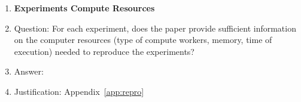 \begin{enumerate}
\item {\bf Experiments Compute Resources}
    \item[] Question: For each experiment, does the paper provide sufficient information on the computer resources (type of compute workers, memory, time of execution) needed to reproduce the experiments?
    \item[] Answer: \answerYes{} %
    \item[] Justification: Appendix~\ref{app:repro}
    

\end{enumerate}
